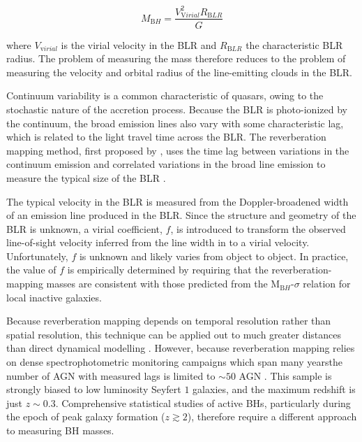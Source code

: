 \begin{equation}
M_{\mathrm BH} = \frac{V_{\mathrm Virial}^2R_{\mathrm BLR}}{G} 
\end{equation}

where $V_{\mathrm virial}$ is the virial velocity in the BLR and $R_{\mathrm BLR}$ the characteristic BLR radius.
The problem of measuring the mass therefore reduces to the problem of measuring the velocity and orbital radius of the line-emitting clouds in the BLR. 

Continuum variability is a common characteristic of quasars, owing to the stochastic nature of the accretion process.  
Because the BLR is photo-ionized by the continuum, the broad emission lines also vary with some characteristic lag, which is related to the light travel time across the BLR. 
The reverberation mapping method, first proposed by \citet{blandford82a}, uses the time lag between variations in the continuum emission and correlated variations in the broad line emission to measure the typical size of the BLR \citep[e.g.][]{peterson93,netzer97,peterson14}. 

The typical velocity in the BLR is measured from the Doppler-broadened width of an emission line produced in the BLR. 
Since the structure and geometry of the BLR is unknown, a virial coefficient, $f$, is introduced to transform the observed line-of-sight velocity inferred from the line width in to a virial velocity.
Unfortunately, $f$ is unknown and likely varies from object to object.  
In practice, the value of $f$ is empirically determined by requiring that the reverberation-mapping masses are consistent with those predicted from the M$_{\mathrm BH}$-$\sigma$ relation for local inactive galaxies. 

Because reverberation mapping depends on temporal resolution rather than spatial resolution, this technique can be applied out to much greater distances than direct dynamical modelling \citep[e.g.][]{kormendy13}.
However, because reverberation mapping relies on dense spectrophotometric monitoring campaigns which span many yearsthe number of AGN with measured lags is limited to $\sim50$ AGN \citep[e.g.][]{kaspi00,peterson04,kaspi07,bentz09,denney10,barth11,grier12}. 
This sample is strongly biased to low luminosity Seyfert $1$ galaxies, and the maximum redshift is just $z\sim0.3$. 
Comprehensive statistical studies of active BHs, particularly during the epoch of peak galaxy formation ($z\gtrsim2$), therefore require a different approach to measuring BH masses. 

